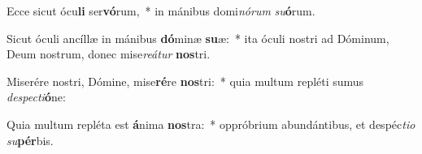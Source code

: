 \item Ecce sicut ócu\textbf{li} ser\textbf{vó}rum,~* in mánibus domi\textit{nó}\textit{rum} \textit{su}\textbf{ó}rum.
\item Sicut óculi ancíllæ in mánibus \textbf{dó}minæ \textbf{su}æ:~* ita óculi nostri ad Dóminum, Deum nostrum, donec mise\textit{re}\textit{á}\textit{tur} \textbf{nos}tri.
\item Miserére nostri, Dómine, mise\textbf{ré}re \textbf{nos}tri:~* quia multum repléti sumus \textit{de}\textit{spec}\textit{ti}\textbf{ó}ne:
\item Quia multum repléta est \textbf{á}nima \textbf{nos}tra:~* oppróbrium abundántibus, et despéc\textit{ti}\textit{o} \textit{su}\textbf{pér}bis.

